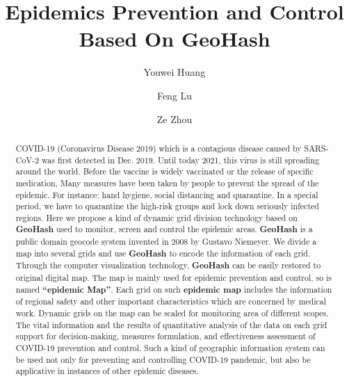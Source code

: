 \documentclass[sigplan,screen]{acmart}
\begin{document}
\title{Epidemics Prevention and Control Based On GeoHash}

\author{Youwei Huang}

\author{Feng Lu}

\author{Ze Zhou}

\begin{abstract}
	COVID-19 (Coronavirus Disease 2019) which is a contagious disease caused by SARS-CoV-2\cite{hu2020characteristics} was first detected in Dec. 2019.
	Until today 2021, this virus is still spreading around the world. Before the vaccine is widely vaccinated or the release of specific medication, Many measures have been taken by people to prevent the spread of the epidemic. For instance: hand hygiene, social distancing and quarantine.
	In a special period, we have to quarantine the high-risk groups and lock down seriously infected regions.
	Here we propose a kind of dynamic grid division technology based on \textbf{GeoHash} used to monitor, screen and control the epidemic areas.
	\textbf{GeoHash} is a public domain geocode system invented in 2008 by Gustavo Niemeyer\cite{niemeyer2008geohash}.
	We divide a map into several grids and use \textbf{GeoHash} to encode the information of each grid.
	Through the computer visualization technology, \textbf{GeoHash} can be easily restored to original digital map.
	The map is mainly used for epidemic prevention and control, so is named \textbf{``epidemic Map''}.
	Each grid on such \textbf{epidemic map} includes the information of regional safety and other important characteristics which are concerned by medical work.
	Dynamic grids on the map can be scaled for monitoring area of different scopes.
	The vital information and the results of quantitative analysis of the data on each grid support for decision-making, measures formulation, and effectiveness assessment of COVID-19 prevention and control.
	Such a kind of geographic information system can be used not only for preventing and controlling COVID-19 pandemic, but also be applicative in instances of other epidemic diseases.
\end{abstract}
\end{document}
